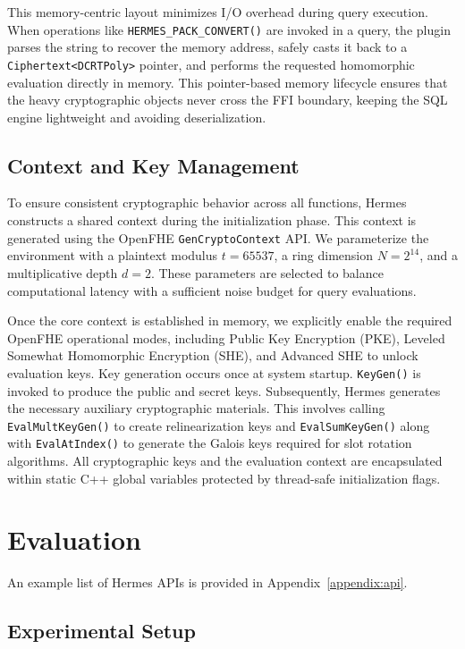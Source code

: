 \documentclass[sigconf,nonacm]{acmart}
\begin{document}
This memory-centric layout minimizes I/O overhead during query execution. When operations like \texttt{HERMES\_PACK\_CONVERT()} are invoked in a query, the plugin parses the string to recover the memory address, safely casts it back to a \texttt{Ciphertext<DCRTPoly>} pointer, and performs the requested homomorphic evaluation directly in memory. This pointer-based memory lifecycle ensures that the heavy cryptographic objects never cross the FFI boundary, keeping the SQL engine lightweight and avoiding deserialization.

\subsection{Context and Key Management}

To ensure consistent cryptographic behavior across all functions, Hermes constructs a shared context during the initialization phase. This context is generated using the OpenFHE \texttt{GenCryptoContext} API. We parameterize the environment with a plaintext modulus $t = 65537$, a ring dimension $N = 2^{14}$, and a multiplicative depth $d = 2$. These parameters are selected to balance computational latency with a sufficient noise budget for query evaluations.

Once the core context is established in memory, we explicitly enable the required OpenFHE operational modes, including Public Key Encryption (PKE), Leveled Somewhat Homomorphic Encryption (SHE), and Advanced SHE to unlock evaluation keys. Key generation occurs once at system startup. \texttt{KeyGen()} is invoked to produce the public and secret keys. Subsequently, Hermes generates the necessary auxiliary cryptographic materials. This involves calling \texttt{EvalMultKeyGen()} to create relinearization keys and \texttt{EvalSumKeyGen()} along with \texttt{EvalAtIndex()} to generate the Galois keys required for slot rotation algorithms. All cryptographic keys and the evaluation context are encapsulated within static C++ global variables protected by thread-safe initialization flags.

\section{Evaluation}
\label{sec:evaluation}

An example list of Hermes APIs is provided in Appendix~\ref{appendix:api}. 

\subsection{Experimental Setup}
\label{sec:datasets}
\end{document}
